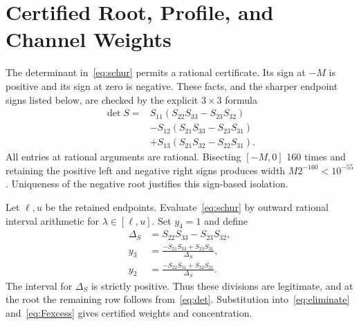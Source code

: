 \documentclass[journal,a4paper,10pt]{IEEEtran}
\theoremstyle{definition}\newtheorem{definition}[theorem]{Definition}
\theoremstyle{remark}\newtheorem{remark}[theorem]{Remark}
\begin{document}
\section{Certified Root, Profile, and Channel Weights}\label{sec:certificate}
The determinant in~\eqref{eq:schur} permits a rational certificate. Its sign at $-M$ is positive and its sign at zero is negative. These facts, and the sharper endpoint signs listed below, are checked by the explicit $3\times3$ formula
\begin{align}\label{eq:det}
\det S={}&S_{11}(S_{22}S_{33}-S_{23}S_{32})\nonumber\\
&-S_{12}(S_{21}S_{33}-S_{23}S_{31})\nonumber\\
&+S_{13}(S_{21}S_{32}-S_{22}S_{31}).
\end{align}
All entries at rational arguments are rational. Bisecting $[-M,0]$ 160 times and retaining the positive left and negative right signs produces width $M2^{-160}<10^{-55}$. Uniqueness of the negative root justifies this sign-based isolation.

Let $\ell,u$ be the retained endpoints. Evaluate~\eqref{eq:schur} by outward rational interval arithmetic for $\lambda\in[\ell,u]$. Set $y_4=1$ and define
\begin{align}
\Delta_S&=S_{22}S_{33}-S_{23}S_{32},\nonumber\\
y_3&=\frac{-S_{21}S_{33}+S_{23}S_{31}}{\Delta_S},\label{eq:ysolve}\\
y_2&=\frac{-S_{22}S_{31}+S_{32}S_{21}}{\Delta_S}.\nonumber
\end{align}
The interval for $\Delta_S$ is strictly positive. Thus these divisions are legitimate, and at the root the remaining row follows from~\eqref{eq:det}. Substitution into~\eqref{eq:eliminate} and~\eqref{eq:Fexcess} gives certified weights and concentration.
\end{document}
